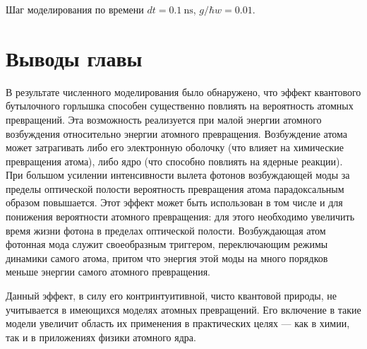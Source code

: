 Шаг моделирования по времени $dt = 0.1~\text{ns}$, $g/\hbar w = 0.01$.

\clearpage
\section{Выводы главы}\label{sec:ch2/sec4}

В результате численного моделирования было обнаружено, что эффект квантового бутылочного горлышка способен существенно повлиять на вероят­ность атомных превращений. Эта возможность реализуется при малой энергии атомного возбуждения относительно энергии атомного превращения. Возбуж­дение атома может затрагивать либо его электронную оболочку (что влияет на химические превращения атома), либо ядро (что способно повлиять на ядерные реакции). При большом усилении интенсивности вылета фотонов возбужда­ющей моды за пределы оптической полости вероятность превращения атома парадоксальным образом повышается. Этот эффект может быть использован в том числе и для понижения вероятности атомного превращения: для этого необходимо увеличить время жизни фотона в пределах оптической полости. Возбуждающая атом фотонная мода служит своеобразным триггером, пере­ключающим режимы динамики самого атома, притом что энергия этой моды на много порядков меньше энергии самого атомного превращения.

Данный эффект, в силу его контринтуитивной, чисто квантовой природы, не учитывается в имеющихся моделях атомных превращений. Его включение в такие модели увеличит область их применения в практических целях --- как в химии, так и в приложениях физики атомного ядра.
